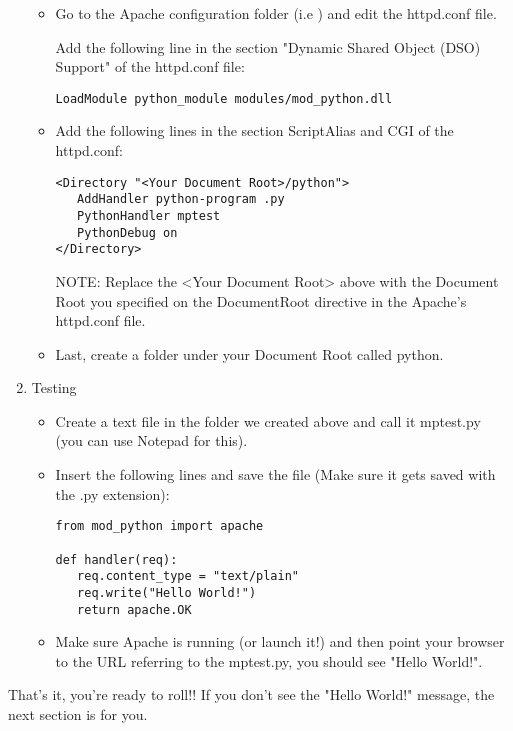\begin{enumerate}
\begin{itemize}
\item
Go to the Apache configuration folder (i.e ) and edit the httpd.conf file. 
            
Add the following line in the section "Dynamic Shared Object (DSO)
Support" of the httpd.conf file:

\begin{verbatim}
LoadModule python_module modules/mod_python.dll
\end{verbatim}                    

\item
Add the following lines in the section ScriptAlias and CGI of the httpd.conf: 

\begin{verbatim}                         
<Directory "<Your Document Root>/python">
   AddHandler python-program .py
   PythonHandler mptest
   PythonDebug on
</Directory>
\end{verbatim}                
    
                    
NOTE: Replace the <Your Document Root> above with the Document Root
you specified on the DocumentRoot directive in the Apache's httpd.conf
file.
                    
\item
Last, create a folder under your Document Root called python. 

\end{itemize}

\item
Testing

\begin{itemize}

\item            
Create a text file in the folder we created above and call it mptest.py
(you can use Notepad for this).
     
\item       
Insert the following lines and save the file (Make sure it gets saved
with the .py extension):

\begin{verbatim}                    
from mod_python import apache

def handler(req):
   req.content_type = "text/plain" 
   req.write("Hello World!")
   return apache.OK
\end{verbatim}                   

\item            
Make sure Apache is running (or launch it!) and then point your
browser to the URL referring to the mptest.py, you should see "Hello
World!".
     
\end{itemize}
\end{enumerate}
       
That's it, you're ready to roll!! If you don't see the "Hello World!"
message, the next section is for you.


